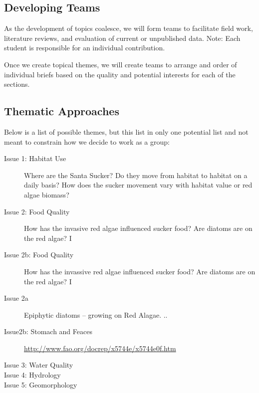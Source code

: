 \documentclass{tufte-handout}\usepackage[]{graphicx}\usepackage[]{color}
\begin{document}
\subsection{Developing Teams}

As the development of topics coalesce, we will form teams to facilitate field work, literature reviews, and evaluation of current or unpublished data. Note: Each student is responsible for an individual contribution. 

Once we create topical themes, we will create teams to arrange and order of  individual briefs based on the quality and potential interests for each of the sections.  

\subsection{Thematic Approaches}

Below is a list of possible themes, but this list in only one potential list and not meant to constrain how we decide to work as a group: 

\begin{description}
  \item[Issue 1: Habitat Use] Where are the Santa Sucker?  Do they move from habitat to habitat on a daily basis? How does the sucker movement vary with habitat value or red algae biomass?
  

  
  \item[Issue 2: Food Quality] How has the invasive red algae influenced sucker food? Are diatoms are on the red algae? I

  \item[Issue 2b: Food Quality] How has the invassive red algae influenced sucker food? Are diatoms are on the red algae? I

  \item[Issue 2a] Epiphytic diatoms -- growing on Red Alagae. ..
  


  \item[Issue2b: Stomach and Feaces] 
  
\href{http://www.fao.org/docrep/x5744e/x5744e0f.htm}{http://www.fao.org/docrep/x5744e/x5744e0f.htm}
  
  \item[Issue 3: Water Quality] 
  \item[Issue 4: Hydrology]
  \item[Issue 5: Geomorphology] 
\end{description}
\end{document}
